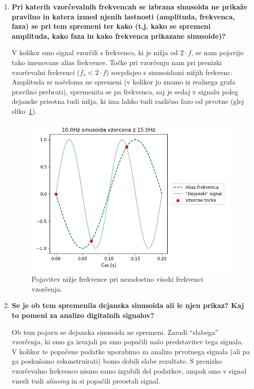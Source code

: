\documentclass[a4paper,11pt]{article}
\begin{document}
\begin{enumerate}
	\item\textbf{ Pri katerih vzorčevalnih frekvencah se izbrana sinusoida ne prikaže pravilno in katera izmed njenih lastnosti (amplituda, frekvenca, faza) se pri tem spremeni ter kako (t.j. kako se spremeni amplituda, kako faza in kako frekvenca prikazane sinusoide)?}

		V kolikor smo signal vzorčili s frekvenco, ki je nižja od $2 \cdot f$, se nam pojavijo tako imenovane alias frekvence. Točke pri vzorčenju nam pri prenizki vzorčevalni frekvenci ($f_s < 2 \cdot f$) sovpdajeo s sinusoidami nižjih frekvenc. Amplituda se načeloma ne spremeni (v kolikor jo znamo iz realnega grafa pravilno prebrati), spremenita se pa frekvenca, saj je sedaj v signalu poleg dejanske prisotna tudi nižja, ki ima lahko tudi različno fazo od prvotne (glej sliko~\ref{slika1}).	
	\begin{figure}[htbp]
	\begin{center}
	\includegraphics[scale=0.6]{alias.png}
	\caption{Pojavitev nižje frekvence pri nezadostno visoki frekvenci vzorčenja.}
	\label{slika1}
	\end{center}
	\end{figure}


 	\item \textbf{Se je ob tem spremenila dejanska sinusoida ali le njen prikaz? Kaj to pomeni za analizo digitalnih signalov?}

	Ob tem pojavu se dejanska sinusoida ne spremeni. Zaradi ``slabega'' vzorčenja, ki smo ga izvajali pa smo popačili našo predstavitev tega signala. V kolikor te popačene podatke uporabimo za analizo prvotnega signala (ali pa ga poskušamo rekonstruirati) bomo dobili slabe rezultate. S prenizko vzorčevalno frekvenco nismo samo izgubili del podatkov, ampak smo v signal vnesli tudi \textit{aliasing} in si popačili preostali signal.


\end{enumerate}
\end{document}
